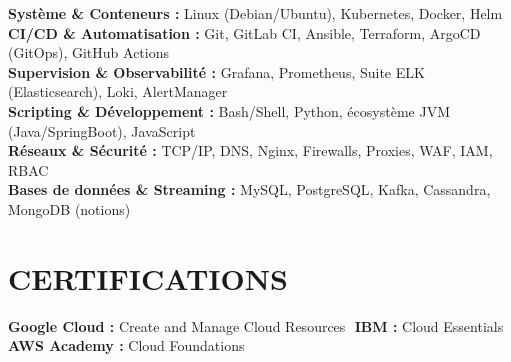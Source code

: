 \documentclass[letterpaper,10pt]{article}
\begin{document}
\begin{itemize}[leftmargin=0in, label={}]
    \small{\item{
     \textbf{Système \& Conteneurs :} {Linux (Debian/Ubuntu), Kubernetes, Docker, Helm}\vspace{2pt} \\
     \textbf{CI/CD \& Automatisation :} {Git, GitLab CI, Ansible, Terraform, ArgoCD (GitOps), GitHub Actions}\vspace{2pt} \\
     \textbf{Supervision \& Observabilité :} {Grafana, Prometheus, Suite ELK (Elasticsearch), Loki, AlertManager}\vspace{2pt} \\
     \textbf{Scripting \& Développement :} {Bash/Shell, Python, écosystème JVM (Java/SpringBoot), JavaScript}\vspace{2pt} \\
     \textbf{Réseaux \& Sécurité :} {TCP/IP, DNS, Nginx, Firewalls, Proxies, WAF, IAM, RBAC}\vspace{2pt} \\
     \textbf{Bases de données \& Streaming :} {MySQL, PostgreSQL, Kafka, Cassandra, MongoDB (notions)}
    }}
\end{itemize}

\section{CERTIFICATIONS}

\begin{itemize}[leftmargin=0in, label={}]
    \small{\item{
     \textbf{Google Cloud :} Create and Manage Cloud Resources \quad $
$ \quad      \textbf{IBM :} Cloud Essentials \quad $
$ \quad      \textbf{AWS Academy :} Cloud Foundations
    }}
\end{itemize}

\end{document}
